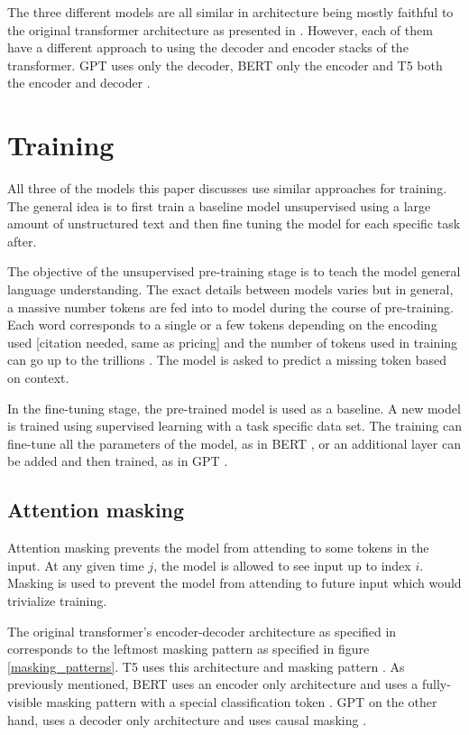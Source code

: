 \documentclass[twoside]{article}
\begin{document}
The three different models are all similar in architecture being mostly
faithful to the original transformer architecture as presented in 
\cite{vaswani_attention_2017}. However, each of them have a different approach
to using the decoder and encoder stacks of the transformer. GPT uses only
the decoder, BERT only the encoder and T5 both the encoder and decoder
\cite{radford_improving_nodate,devlin_bert_2019,raffel_exploring_2020}.

\section{Training}
All three of the models this paper discusses use similar approaches for 
training. The general idea is to first train a baseline model unsupervised 
using a large amount of unstructured text and then fine tuning the model
for each specific task after. 

The objective of the unsupervised pre-training stage is to teach the model
general language understanding. The exact details between models varies but
in general, a massive number tokens are fed into to model during the course
of pre-training. Each word corresponds to a single or a few tokens depending on 
the encoding used [citation needed, same as pricing] and the number of tokens
used in training can go up to the trillions \cite{raffel_exploring_2020}. 
The model is asked to predict a missing token based on context. 

In the fine-tuning stage, the pre-trained model is used as a baseline. A new
model is trained using supervised learning with a task specific data set. 
The training can fine-tune all the parameters of the model, as in BERT 
\cite{devlin_bert_2019}, or an additional layer can be added and then
trained, as in GPT \cite{radford_improving_nodate}.

\subsection{Attention masking}
Attention masking prevents the model from attending to some tokens in the input. At any
given time $j$, the model is allowed to see input up to index $i$. Masking is used to prevent the model from
attending to future input which would trivialize training. \cite{raffel_exploring_2020}

The original transformer's encoder-decoder architecture as specified in 
\cite{vaswani_attention_2017} corresponds to the leftmost masking pattern as
specified in figure \ref{masking_patterns}. T5 uses this architecture and masking pattern
\cite{raffel_exploring_2020}. As previously mentioned, BERT uses an encoder
only architecture \cite{devlin_bert_2019} and uses a fully-visible masking 
pattern with a special classification token \cite{raffel_exploring_2020}. GPT on
the other hand, uses a decoder only architecture \cite{radford_improving_nodate}
and uses causal masking \cite{liu_generating_2018}.
\end{document}
